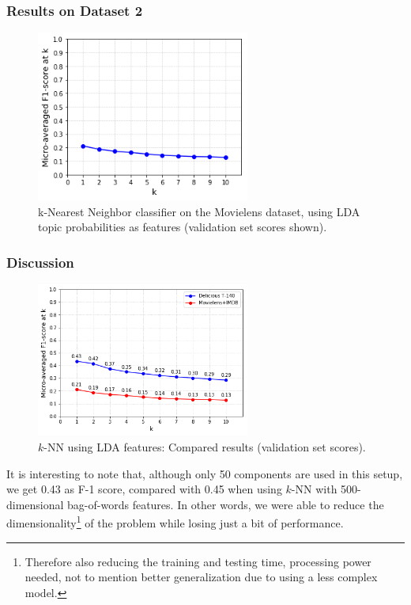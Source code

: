 \subsubsection{Results on Dataset 2}

\begin{figure}[H]
    \centering
    \includegraphics[width=7cm]{chapters/05_experiments/images/knn-lda-movielens.png}
    \caption{k-Nearest Neighbor classifier on the Movielens dataset, using LDA topic probabilities as features (validation set scores shown).}
    \label{fig:knn_lda_movielens}
\end{figure}

\subsubsection{Discussion}

\begin{figure}[H]
    \centering
    \includegraphics[width=7cm]{chapters/05_experiments/images/proposal-1-compared-knn-lda.png}
    \caption{$k$-NN using LDA features: Compared results (validation set scores).}
    \label{fig:compared_knn_lda}
\end{figure}

It is interesting to note that, although only 50 components are used in this setup, we get 0.43 as F-1 score, compared with 0.45 when using $k$-NN with 500-dimensional bag-of-words features. In other words, we were able to reduce the dimensionality\footnote{Therefore also reducing the training and testing time, processing power needed, not to mention better generalization due to using a less complex model.} of the problem while losing just a bit of performance.  

